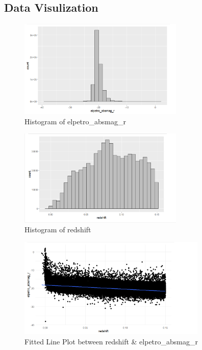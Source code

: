 \documentclass[12pt]{article}
\begin{document}
\subsection{Data Visulization}

\begin{figure}[h]
	\centering
	\includegraphics[width=0.7\textwidth]{pic/h1.png}
	\caption{Histogram of elpetro\_absmag\_r}
\end{figure}

\begin{figure}[h]
	\centering
	\includegraphics[width=0.7\textwidth]{pic/h2.png}
	\caption{Histogram of redshift}
\end{figure}

\begin{figure}[h]
	\centering
	\includegraphics[width=0.8\textwidth]{pic/lr.png}
	\caption{Fitted Line Plot between redshift \& elpetro\_absmag\_r}
\end{figure}
\end{document}
